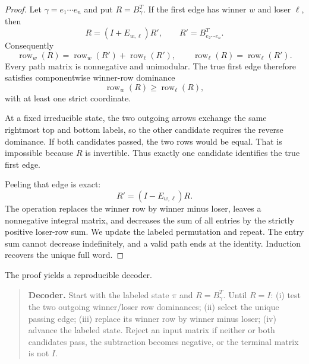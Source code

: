 \begin{proof}
Let \(\gamma=e_1\cdots e_n\) and put \(R=B_\gamma^T\).  If the first edge
has winner \(w\) and loser \(\ell\), then
\begin{equation}
 R=(I+E_{w,\ell})R',
 \qquad R'=B_{e_2\cdots e_n}^T.
 \label{eq:first-factor}
\end{equation}
Consequently
\begin{equation}
 \operatorname{row}_w(R)
 =\operatorname{row}_w(R')+\operatorname{row}_\ell(R'),
 \qquad
 \operatorname{row}_\ell(R)=\operatorname{row}_\ell(R').
 \label{eq:row-dominance}
\end{equation}
Every path matrix is nonnegative and unimodular.  The true first edge
therefore satisfies componentwise winner-row dominance
\begin{equation}
 \operatorname{row}_w(R)\ge\operatorname{row}_\ell(R),
 \label{eq:dominance}
\end{equation}
with at least one strict coordinate.

At a fixed irreducible state, the two outgoing arrows exchange the same
rightmost top and bottom labels, so the other candidate requires the reverse
dominance.  If both candidates passed, the two rows would be equal.  That is
impossible because \(R\) is invertible.  Thus exactly one candidate identifies
the true first edge.

Peeling that edge is exact:
\begin{equation}
 R'=(I-E_{w,\ell})R.
 \label{eq:row-peel}
\end{equation}
The operation replaces the winner row by winner minus loser, leaves a
nonnegative integral matrix, and decreases the sum of all entries by the
strictly positive loser-row sum.  We update the labeled permutation and
repeat.  The entry sum cannot decrease indefinitely, and a valid path ends
at the identity.  Induction recovers the unique full word.
\end{proof}

The proof yields a reproducible decoder.

\begin{quote}
\textbf{Decoder.} Start with the labeled state \(\pi\) and
\(R=B_\gamma^T\).  Until \(R=I\): (i) test the two outgoing winner/loser
row dominances; (ii) select the unique passing edge; (iii) replace its winner
row by winner minus loser; (iv) advance the labeled state.  Reject an input
matrix if neither or both candidates pass, the subtraction becomes negative,
or the terminal matrix is not \(I\).
\end{quote}

